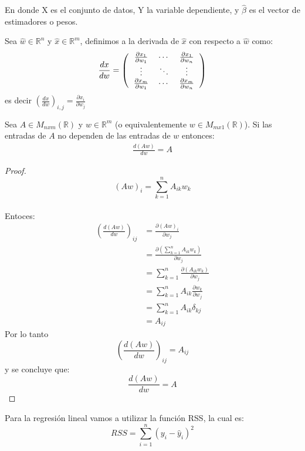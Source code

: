 \documentclass[12pt,a4paper]{book}
\begin{document}
En donde X es el conjunto de datos, Y la variable dependiente, y $\widehat{\beta}$ es el vector de estimadores o pesos.
\begin{definicion}{}{}
Sea $\widehat{w}\in\mathbb{R}^{n}$ y $\widehat{x}\in\mathbb{R}^{m}$, definimos a la derivada de $\widehat{x}$ con respecto a $\widehat{w}$ como:
\begin{equation*}
\begin{split}
\frac{dx}{dw}=\left(
\begin{tabular}{ccc}
$\frac{\partial x_{1}}{\partial w_{1}}$ & $\cdots$ & $\frac{\partial x_{1}}{\partial w_{n}}$ \\ 
$\vdots$ & $\ddots$ & $\vdots$ \\ 
$\frac{\partial x_{m}}{\partial w_{1}}$ & $\cdots$ & $\frac{\partial x_{m}}{\partial w_{n}}$ \\ 
\end{tabular} 
\right)
\end{split}
\end{equation*}
es decir $\left( \frac{dx}{dw} \right)_{i,j}=\frac{\partial x_{i}}{\partial w_{j}}$
\end{definicion}
\smallskip
\begin{proposicion}{}{}
Sea $A \in M_{nxm}(\mathbb{R})$ y $w \in \mathbb{R}^m$ (o equivalentemente $w \in M_{mx1}(\mathbb{R})$). Si las entradas de $A$ no dependen de las entradas de $w$ entonces:
\begin{equation*}
\begin{split}
\frac{d(Aw)}{dw} = A
\end{split}
\end{equation*}
\end{proposicion}
\begin{proof}
$$(Aw)_i = \sum_{k = 1}^n A_{ik}w_k$$\\
Entoces:
\begin{equation*}
\begin{split}
\left(\frac{d(Aw)}{dw}\right)_{ij} &= \frac{\partial (Aw)_i}{\partial w_j}\\&= \frac{\partial \left(\sum_{k = 1}^n A_{ik}w_k\right)}{\partial w_j}\\&= \sum_{k = 1}^n \frac{\partial(A_{ik}w_k)}{\partial w_j}\\
&= \sum_{k = 1}^n A_{ik}\frac{\partial w_k}{\partial w_j}\\& = \sum_{k = 1}^n A_{ik}\delta_{kj}\\& = A_{ij}
\end{split}
\end{equation*}
Por lo tanto $$ \left(\frac{d(Aw)}{dw}\right)_{ij} = A_{ij}$$
y se concluye que:
$$\frac{d(Aw)}{dw} = A$$
\end{proof}
Para la regresión lineal vamos a utilizar la función RSS, la cual es:
$$RSS = \sum_{i = 1}^n (y_i - \hat{y}_i)^2$$
\end{document}
